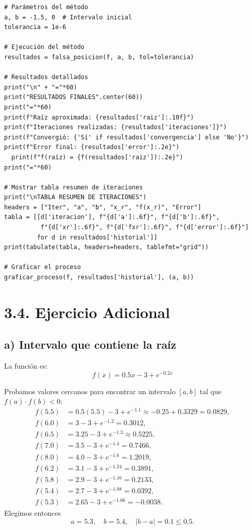 \documentclass[12pt]{article}
\begin{document}
\begin{center}
\begin{tcolorbox}[title=Codigo python,
                  colback=white,
                  colframe=black,
                  breakable, enhanced]
\begin{lstlisting}[style=mypython]
# Parámetros del método
a, b = -1.5, 0  # Intervalo inicial
tolerancia = 1e-6

# Ejecución del método
resultados = falsa_posicion(f, a, b, tol=tolerancia)

# Resultados detallados
print("\n" + "="*60)
print("RESULTADOS FINALES".center(60))
print("="*60)
print(f"Raíz aproximada: {resultados['raiz']:.10f}")
print(f"Iteraciones realizadas: {resultados['iteraciones']}")
print(f"Convergió: {'Sí' if resultados['convergencia'] else 'No'}")
print(f"Error final: {resultados['error']:.2e}")
  print(f"f(raíz) = {f(resultados['raiz']):.2e}")
print("="*60)

# Mostrar tabla resumen de iteraciones
print("\nTABLA RESUMEN DE ITERACIONES")
headers = ["Iter", "a", "b", "x_r", "f(x_r)", "Error"]
tabla = [[d['iteracion'], f"{d['a']:.6f}", f"{d['b']:.6f}", 
          f"{d['xr']:.6f}", f"{d['fxr']:.6f}", f"{d['error']:.6f}"] 
         for d in resultados['historial']]
print(tabulate(tabla, headers=headers, tablefmt="grid"))

# Graficar el proceso
graficar_proceso(f, resultados['historial'], (a, b))
\end{lstlisting}
\end{tcolorbox}

\section*{3.4. Ejercicio Adicional}

\subsection*{a) Intervalo que contiene la raíz}

La función es:
\[
f(x) = 0.5x - 3 + e^{-0.2x}
\]

Probamos valores cercanos para encontrar un intervalo \([a, b]\) tal que \(f(a)\cdot f(b)<0\):
\[
\begin{aligned}
f(5.5) &= 0.5(5.5) - 3 + e^{-1.1} \approx -0.25 + 0.3329 = 0.0829,\\
f(6.0) &= 3 - 3 + e^{-1.2} = 0.3012,\\
f(6.5) &= 3.25 - 3 + e^{-1.3} \approx 0.5225,\\
f(7.0) &= 3.5 - 3 + e^{-1.4} = 0.7466,\\
f(8.0) &= 4.0 - 3 + e^{-1.6} = 1.2019,\\
f(6.2) &= 3.1 - 3 + e^{-1.24} = 0.3891,\\
f(5.8) &= 2.9 - 3 + e^{-1.16} = 0.2133,\\
f(5.4) &= 2.7 - 3 + e^{-1.08} = 0.0392,\\
f(5.3) &= 2.65 - 3 + e^{-1.06} = -0.0038.
\end{aligned}
\]
Elegimos entonces
\[
\boxed{a = 5.3,\quad b = 5.4,\quad |b-a|=0.1\le0.5.}
\]


\end{center}
\end{document}
